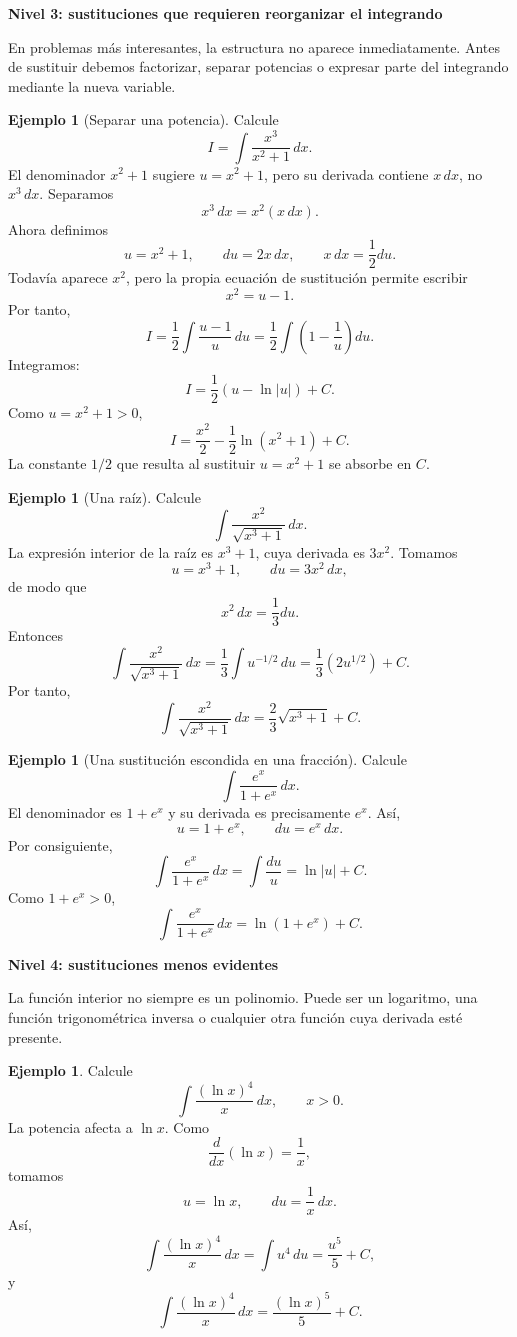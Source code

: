 \documentclass[12pt]{article}
\theoremstyle{definition}
\newtheorem{ejemplo}[teorema]{Ejemplo}
\theoremstyle{remark}
\begin{document}
\textbf{Nivel 3: sustituciones que requieren reorganizar el integrando}

En problemas más interesantes, la estructura no aparece inmediatamente. Antes de sustituir debemos factorizar, separar potencias o expresar parte del integrando mediante la nueva variable.

\begin{ejemplo}[Separar una potencia]
Calcule
\[
I=\int\frac{x^3}{x^2+1}\,dx.
\]
El denominador $x^2+1$ sugiere $u=x^2+1$, pero su derivada contiene $x\,dx$, no $x^3\,dx$. Separamos
\[
x^3\,dx=x^2(x\,dx).
\]
Ahora definimos
\[
u=x^2+1,\qquad du=2x\,dx,
\qquad x\,dx=\frac12du.
\]
Todavía aparece $x^2$, pero la propia ecuación de sustitución permite escribir
\[
x^2=u-1.
\]
Por tanto,
\[
I=\frac12\int\frac{u-1}{u}\,du
=\frac12\int\left(1-\frac1u\right)du.
\]
Integramos:
\[
I=\frac12(u-\ln|u|)+C.
\]
Como $u=x^2+1>0$,
\[
\boxed{I=\frac{x^2}{2}-\frac12\ln(x^2+1)+C.}
\]
La constante $1/2$ que resulta al sustituir $u=x^2+1$ se absorbe en $C$.
\end{ejemplo}

\begin{ejemplo}[Una raíz]
Calcule
\[
\int\frac{x^2}{\sqrt{x^3+1}}\,dx.
\]
La expresión interior de la raíz es $x^3+1$, cuya derivada es $3x^2$. Tomamos
\[
u=x^3+1,\qquad du=3x^2\,dx,
\]
de modo que
\[
x^2\,dx=\frac13du.
\]
Entonces
\[
\int\frac{x^2}{\sqrt{x^3+1}}\,dx
=\frac13\int u^{-1/2}\,du
=\frac13(2u^{1/2})+C.
\]
Por tanto,
\[
\boxed{\int\frac{x^2}{\sqrt{x^3+1}}\,dx=\frac23\sqrt{x^3+1}+C.}
\]
\end{ejemplo}

\begin{ejemplo}[Una sustitución escondida en una fracción]
Calcule
\[
\int\frac{e^x}{1+e^x}\,dx.
\]
El denominador es $1+e^x$ y su derivada es precisamente $e^x$. Así,
\[
u=1+e^x,\qquad du=e^x\,dx.
\]
Por consiguiente,
\[
\int\frac{e^x}{1+e^x}\,dx
=\int\frac{du}{u}
=\ln|u|+C.
\]
Como $1+e^x>0$,
\[
\boxed{\int\frac{e^x}{1+e^x}\,dx=\ln(1+e^x)+C.}
\]
\end{ejemplo}

\textbf{Nivel 4: sustituciones menos evidentes}

La función interior no siempre es un polinomio. Puede ser un logaritmo, una función trigonométrica inversa o cualquier otra función cuya derivada esté presente.

\begin{ejemplo}
Calcule
\[
\int\frac{(\ln x)^4}{x}\,dx,\qquad x>0.
\]
La potencia afecta a $\ln x$. Como
\[
\frac{d}{dx}(\ln x)=\frac1x,
\]
tomamos
\[
u=\ln x,\qquad du=\frac1x\,dx.
\]
Así,
\[
\int\frac{(\ln x)^4}{x}\,dx
=\int u^4\,du
=\frac{u^5}{5}+C,
\]
y
\[
\boxed{\int\frac{(\ln x)^4}{x}\,dx=\frac{(\ln x)^5}{5}+C.}
\]
\end{ejemplo}
\end{document}

